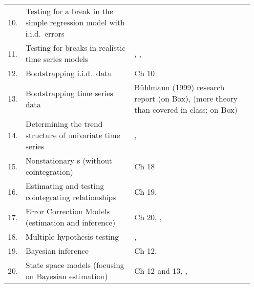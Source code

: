 \documentclass[nofonts,nols]{tufte-handout}
\renewcommand{\allcaps}[1]{\textls{\MakeUppercase{#1}}}
\newcommand{\VAR}{\allcaps{VAR}}
\begin{document}
\begin{table*}[h]
\begin{tabularx}{\textwidth}{rXX}
    10. & Testing for a break in the simple regression model with i.i.d.\ errors & \citep[Sec 5]{St94}                                                                                     \\
    11. & Testing for breaks in realistic time series models                     & \citep{An03}, \citep{Ba97}, \citep{BP98}                                                                \\
    12. & Bootstrapping i.i.d.\ data                                             & \citep{Ha14} Ch 10                                                                                      \\
    13. & Bootstrapping time series data                                         & B\"{u}hlmann (1999) research report (on Box), \citep{HHK03} (more theory than covered in class; on Box) \\
    14. & Determining the trend structure of univariate time series              & \citep{AB00}, \citep{HLT07}                                                                             \\
    15. & Nonstationary \VAR s (without cointegration)                           & \citep{Ha94} Ch 18                                                                                      \\
    16. & Estimating and testing cointegrating relationships                     & \citep{Ha94} Ch 19,  \citep{Jo14}                                                                       \\
    17. & Error Correction Models (estimation and inference)                     & \citep{Ha94} Ch 20, \citep{Da13}, \citep{Jo14}                                                          \\
    18. & Multiple hypothesis testing                                            & \citep{RW05}, \citep{Ro08}                                                                              \\
    19. & Bayesian inference                                                     & \citep{Ha94} Ch 12, \citep{Ch12}                                                                        \\
    20. & State space models (focusing on Bayesian estimation)                   & \citep{Ha94} Ch 12 and 13, \citep{Fe11}, \citep{Ch12}                                                   \\
    \bottomrule
  \end{tabularx}
\end{table*}
\end{document}
